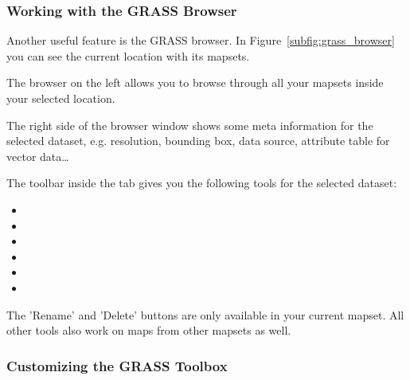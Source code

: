 \subsubsection{Working with the GRASS Browser} 

Another useful feature is the GRASS browser. In Figure~\ref{subfig:grass_browser}
you can see the current location with its mapsets. 

The browser on the left allows you to browse through all your mapsets inside your selected
location. 

The right side of the browser window shows some meta information for the selected dataset, e.g. resolution,
bounding box, data source, attribute table for vector data\dots

The toolbar inside the  tab gives you the following tools for the selected dataset:
\begin{itemize}
\item {}
\item {}
\item {}
\item {}
\item {}
\item {}
\end{itemize}

The 'Rename' and 'Delete' buttons are only available in your current mapset. All other tools also work on
maps from other mapsets as well.


\subsubsection{Customizing the GRASS Toolbox} 
\label{sec:toolbox-customizing}

